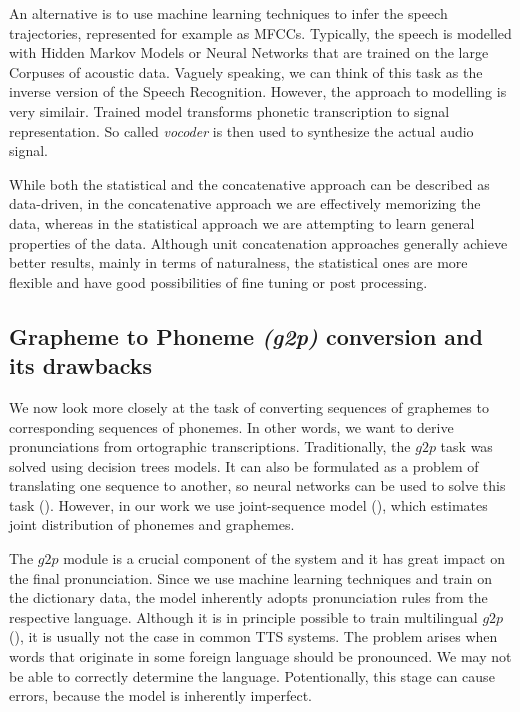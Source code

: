 \par
An alternative is to use machine learning techniques to infer the speech trajectories, represented for example as MFCCs.
Typically, the speech is modelled with Hidden Markov Models or Neural Networks that are trained on the large Corpuses of acoustic data.
Vaguely speaking, we can think of this task as the inverse version of the Speech Recognition.
However, the approach to modelling is very similair.
Trained model transforms phonetic transcription to signal representation.
So called \textit{vocoder} is then used to synthesize the actual audio signal.
\par
While both the statistical and the concatenative approach can be described as data-driven, in the concatenative approach we are effectively memorizing the data, whereas in the statistical approach we are attempting to learn general properties of the data.
Although unit concatenation approaches generally achieve better results, mainly in terms of naturalness, the statistical ones are more flexible and have good possibilities of fine tuning or post processing.
\subsection{Grapheme to Phoneme \textit{(g2p)} conversion and its drawbacks}
\label{g2p-desc}
We now look more closely at the task of converting sequences of graphemes to corresponding sequences of phonemes.
In other words, we want to derive pronunciations from ortographic transcriptions.
Traditionally, the $g2p$ task was solved using decision trees models.
It can also be formulated as a problem of translating one sequence to another, so neural networks can be used to solve this task (\cite{yao2015sequence}).
However, in our work we use joint-sequence model (\cite{bisani2008joint}), which estimates joint distribution of phonemes and graphemes.
\par
The $g2p$ module is a crucial component of the system and it has great impact on the final pronunciation.
Since we use machine learning techniques and train on the dictionary data, the model inherently adopts pronunciation rules from the respective language.
Although it is in principle possible to  train multilingual $g2p$ (\cite{schlippe2012grapheme}), it is usually not the case in common TTS systems.
The problem arises when words that originate in some foreign language should be pronounced.
We may not be able to correctly determine the language.
Potentionally, this stage can cause errors, because the model is inherently imperfect.
